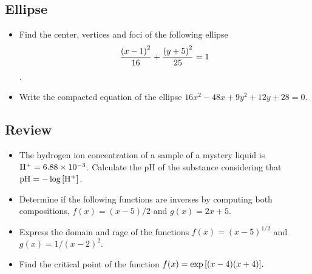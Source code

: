 \documentclass[../main-exe.tex]{subfiles}
\begin{document}
\subsection{Ellipse}

\begin{itemize}
    \item Find the center, vertices and foci of the following ellipse \[\frac{\qty(x-1)^2}{16} + \frac{\qty(y+5)^2}{25} = 1\].
    \item Write the compacted equation of the ellipse $16x^2-48x+9y^2+12y+28=0$.
\end{itemize}

\subsection{Review}

\begin{itemize}
    \item The hydrogen ion concentration of a sample of a mystery liquid is $\mathrm{H}^+=\num{6.88d-3}$.
        Calculate the pH of the substance considering that $\mathrm{pH}=-\log\qty[\mathrm{H}^+]$.
    \item Determine if the following functions are inverses by computing both compositions, $f(x)=(x-5)/2$ and $g(x)=2x+5$.
    \item Express the domain and rage of the functions $f(x)=(x-5)^{1/2}$ and $g(x)=1/(x-2)^2$.
    \item Find the critical point of the function $f(x)=\exp\qty[\qty(x-4)\qty(x+4)].$
\end{itemize}
\end{document}
